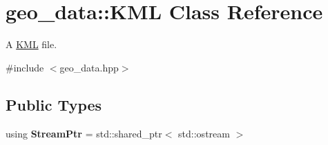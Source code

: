 \hypertarget{classgeo__data_1_1KML}{}\section{geo\+\_\+data\+:\+:K\+ML Class Reference}
\label{classgeo__data_1_1KML}


A \hyperlink{classgeo__data_1_1KML}{K\+ML} file.  




{\ttfamily \#include $<$geo\+\_\+data.\+hpp$>$}

\subsection*{Public Types}
\begin{DoxyCompactItemize}
\item 
using {\bfseries Stream\+Ptr} = std\+::shared\+\_\+ptr$<$ std\+::ostream $>$\hypertarget{classgeo__data_1_1KML_a0523f1943a5bdfad5d7c7d707edeec17}{}\label{classgeo__data_1_1KML_a0523f1943a5bdfad5d7c7d707edeec17}

\end{DoxyCompactItemize}
